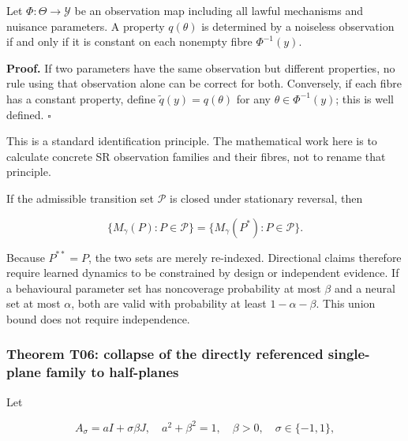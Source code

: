 \documentclass[11pt,a4paper]{article}
\begin{document}
Let \(\Phi:\Theta\to\mathcal Y\) be an observation map including all
lawful mechanisms and nuisance parameters. A property \(q(\theta)\) is
determined by a noiseless observation if and only if it is constant on
each nonempty fibre \(\Phi^{-1}(y)\).

\textbf{Proof.} If two parameters have the same observation but
different properties, no rule using that observation alone can be
correct for both. Conversely, if each fibre has a constant property,
define \(\widetilde q(y)=q(\theta)\) for any \(\theta\in\Phi^{-1}(y)\);
this is well defined. \(\square\)

This is a standard identification principle. The mathematical work here
is to calculate concrete SR observation families and their fibres, not
to rename that principle.

\par
\noindent\begin{minipage}{\linewidth}

If the admissible transition set \(\mathcal P\) is closed under
stationary reversal, then

\[
\{M_\gamma(P):P\in\mathcal P\}
=\{M_\gamma(P^*):P\in\mathcal P\}.
\]

\end{minipage}\par

Because \(P^{**}=P\), the two sets are merely re-indexed. Directional
claims therefore require learned dynamics to be constrained by design or
independent evidence. If a behavioural parameter set has noncoverage
probability at most \(\beta\) and a neural set at most \(\alpha\), both
are valid with probability at least \(1-\alpha-\beta\). This union bound
does not require independence.

\subsubsection{Theorem T06: collapse of the directly referenced
single-plane family to
half-planes}\label{theorem-t06-collapse-of-the-directly-referenced-single-plane-family-to-half-planes}

\par
\noindent\begin{minipage}{\linewidth}

Let

\[
A_\sigma=aI+\sigma\beta J,\quad
a^2+\beta^2=1,\quad\beta>0,\quad\sigma\in\{-1,1\},
\]

\end{minipage}\par
\end{document}
